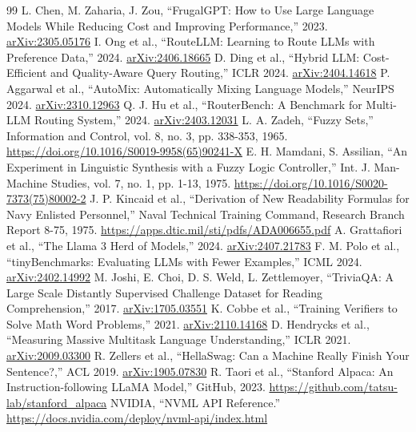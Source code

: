 \begin{thebibliography}{99}
 L. Chen, M. Zaharia, J. Zou, ``FrugalGPT: How to Use Large Language Models While Reducing Cost and Improving Performance,'' 2023. \href{https://arxiv.org/abs/2305.05176}{arXiv:2305.05176}
 I. Ong et al., ``RouteLLM: Learning to Route LLMs with Preference Data,'' 2024. \href{https://arxiv.org/abs/2406.18665}{arXiv:2406.18665}
 D. Ding et al., ``Hybrid LLM: Cost-Efficient and Quality-Aware Query Routing,'' ICLR 2024. \href{https://arxiv.org/abs/2404.14618}{arXiv:2404.14618}
 P. Aggarwal et al., ``AutoMix: Automatically Mixing Language Models,'' NeurIPS 2024. \href{https://arxiv.org/abs/2310.12963}{arXiv:2310.12963}
 Q. J. Hu et al., ``RouterBench: A Benchmark for Multi-LLM Routing System,'' 2024. \href{https://arxiv.org/abs/2403.12031}{arXiv:2403.12031}
 L. A. Zadeh, ``Fuzzy Sets,'' Information and Control, vol. 8, no. 3, pp. 338-353, 1965. \url{https://doi.org/10.1016/S0019-9958(65)90241-X}
 E. H. Mamdani, S. Assilian, ``An Experiment in Linguistic Synthesis with a Fuzzy Logic Controller,'' Int. J. Man-Machine Studies, vol. 7, no. 1, pp. 1-13, 1975. \url{https://doi.org/10.1016/S0020-7373(75)80002-2}
 J. P. Kincaid et al., ``Derivation of New Readability Formulas for Navy Enlisted Personnel,'' Naval Technical Training Command, Research Branch Report 8-75, 1975. \url{https://apps.dtic.mil/sti/pdfs/ADA006655.pdf}
 A. Grattafiori et al., ``The Llama 3 Herd of Models,'' 2024. \href{https://arxiv.org/abs/2407.21783}{arXiv:2407.21783}
 F. M. Polo et al., ``tinyBenchmarks: Evaluating LLMs with Fewer Examples,'' ICML 2024. \href{https://arxiv.org/abs/2402.14992}{arXiv:2402.14992}
 M. Joshi, E. Choi, D. S. Weld, L. Zettlemoyer, ``TriviaQA: A Large Scale Distantly Supervised Challenge Dataset for Reading Comprehension,'' 2017. \href{https://arxiv.org/abs/1705.03551}{arXiv:1705.03551}
 K. Cobbe et al., ``Training Verifiers to Solve Math Word Problems,'' 2021. \href{https://arxiv.org/abs/2110.14168}{arXiv:2110.14168}
 D. Hendrycks et al., ``Measuring Massive Multitask Language Understanding,'' ICLR 2021. \href{https://arxiv.org/abs/2009.03300}{arXiv:2009.03300}
 R. Zellers et al., ``HellaSwag: Can a Machine Really Finish Your Sentence?,'' ACL 2019. \href{https://arxiv.org/abs/1905.07830}{arXiv:1905.07830}
 R. Taori et al., ``Stanford Alpaca: An Instruction-following LLaMA Model,'' GitHub, 2023. \url{https://github.com/tatsu-lab/stanford_alpaca}
 NVIDIA, ``NVML API Reference.'' \url{https://docs.nvidia.com/deploy/nvml-api/index.html}

\end{thebibliography}

